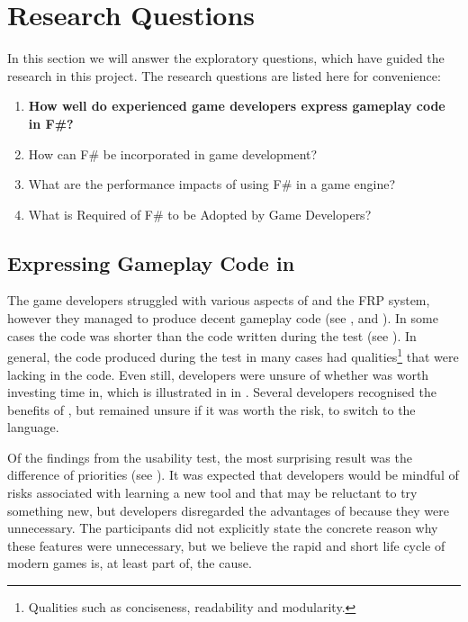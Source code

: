 \section{Research Questions}
In this section we will answer the exploratory questions, which have guided the research in this project. The research questions are listed here for convenience:
\begin{center}
    \begin{enumerate}
        \item \textbf{How well do experienced game developers express gameplay code in F\#?}
        \item How can F\# be incorporated in game development?
        \item What are the performance impacts of using F\# in a game engine?
        \item What is Required of F\# to be Adopted by Game Developers?
    \end{enumerate}
\end{center}

\subsection{Expressing Gameplay Code in \fs}
The game developers struggled with various aspects of \fs and the \gls{FRP} system, however they managed to produce decent gameplay code (see ,  and ). In some cases the \fs code was shorter than the \cs code written during the test (see ). In general, the \fs code produced during the test in many cases had qualities\footnote{Qualities such as conciseness, readability and modularity.} that were lacking in the \cs code. Even still, developers were unsure of whether \fs was worth investing time in, which is illustrated in in . Several developers recognised the benefits of \fs, but remained unsure if it was worth the risk, to switch to the language.

Of the findings from the usability test, the most surprising result was the difference of priorities (see ). It was expected that developers would be mindful of risks associated with learning a new tool and that may be reluctant to try something new, but developers disregarded the advantages of \fs because they were unnecessary. The participants did not explicitly state the concrete reason why these features were unnecessary, but we believe the rapid and short life cycle of modern games is, at least part of, the cause.

